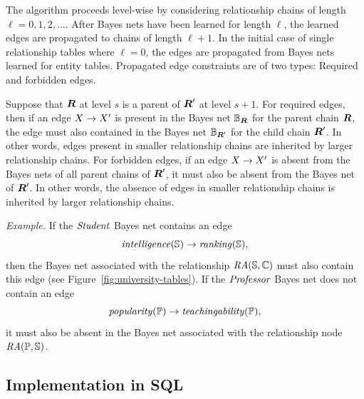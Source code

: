 \documentclass{vldb}
\begin{document}
 The algorithm proceeds level-wise by considering relationship chains of length $\ell = 0,1, 2, \ldots$. After Bayes nets have been learned for length $\ell$, the learned edges are propagated to chains of length $\ell+1$. In the initial case of single relationship tables where $\ell=0$, the edges are propagated from Bayes nets learned for entity tables. Propagated edge constraints are of two types: Required and forbidden edges. 

Suppose that $\rchain$ at level $s$ is a parent of $\rchain'$ at level $s+1$.  For required edges, then if an edge $\node \rightarrow \node'$ is present in the Bayes net $\B_{\rchain}$ for the parent chain $\rchain$, the edge must also contained in the Bayes net $\B_{\rchain'}$ for the child  chain $\rchain'$. In other words, edges present in smaller relationship chains are inherited by larger relationship chains. For forbidden edges, if an edge $\node \rightarrow \node'$ is absent from the Bayes nets of all parent chains of $\rchain'$, it must also be absent from the Bayes net of $\rchain'$. In other words, the absence of edges in smaller relationship chains is inherited by larger relationship chains.

{\em Example.} 
If the $\student$ Bayes net contains an edge $$\it{intelligence}(\S) \rightarrow \it{ranking}(\S),$$ then the Bayes net associated with the relationship $\it{\ra(\S,\C)}$ must also contain this edge (see Figure~\ref{fig:university-tables}). 
If the $\prof$ Bayes net does not contain an edge $$\it{popularity}(\P) \rightarrow \it{teachingability}(\P),$$ it must also be absent in the Bayes net associated with the relationship node $\ra(\P,\S)$.




\subsection{Implementation in SQL} 
\end{document}
